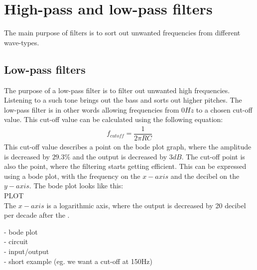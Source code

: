 \chapter{High-pass and low-pass filters}
The main purpose of filters is to sort out unwanted frequencies from different wave-types. 

\section{Low-pass filters}
The purpose of a low-pass filter is to filter out unwanted high frequencies. Listening to a such tone brings out the bass and sorts out higher pitches. The low-pass filter is in other words allowing frequencies from 0$Hz$ to a chosen cut-off value. This cut-off value can be calculated using the following equation:
\begin{align*}
f_{cutoff}=\dfrac{1}{2 \pi RC}
\end{align*}
This cut-off value describes a point on the bode plot graph, where the amplitude is decreased by $29.3\%$ and the output is decreased by 3$dB$. The cut-off point is also the point, where the filtering starts getting efficient. This can be expressed using a bode plot, with the frequency on the $x-axis$ and the decibel on the $y-axis$. The bode plot looks like this: \\
PLOT \\
The $x-axis$ is a logarithmic axis, where the output is decreased by 20 decibel per decade after the . 
\begin{figure}[H]
	
\end{figure}


- bode plot \\
- circuit \\
- input/output \\
- short example (eg. we want a cut-off at 150Hz)